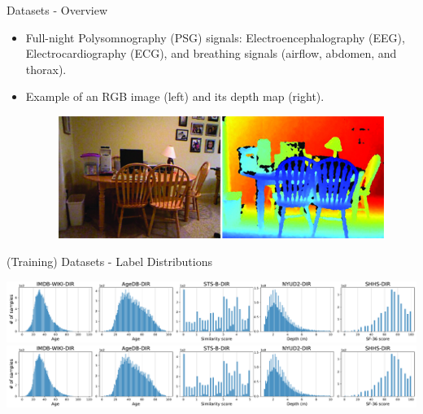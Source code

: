\begin{frame}{Datasets - Overview}
\begin{table}[!t]
	\end{table}
	\begin{itemize}\tiny
		\item Full-night Polysomnography (PSG) signals: Electroencephalography (EEG), Electrocardiography (ECG), and breathing signals (airflow, abdomen, and thorax).
		\item Example of an RGB image (left) and its depth map (right).
		\begin{figure}[h]
			\includegraphics[width=0.5\linewidth]{images/nyu_depth_v2_raw.jpg}
		\end{figure}
	\end{itemize}
\end{frame}

\begin{frame}{(Training) Datasets - Label Distributions}
	\begin{center}
		\includegraphics[trim={0 0 52em 0},clip,scale=0.4]{images/dataset_info.pdf}
		\includegraphics[trim={78.8em 0 0 0},clip,scale=0.4]{images/dataset_info.pdf}
	\end{center}
\end{frame}